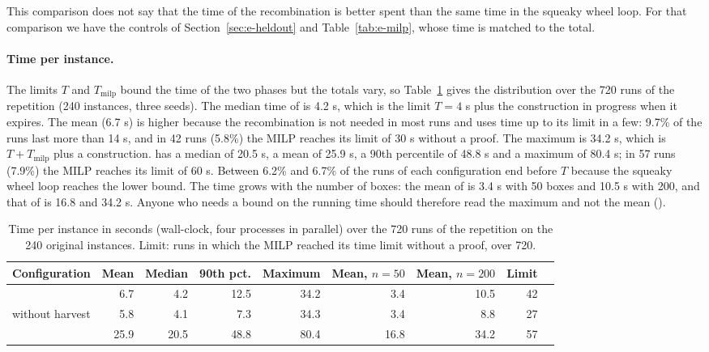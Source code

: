 This comparison does not say that the time of the recombination is better spent than the same time in the squeaky wheel loop. For that
comparison we have the controls of Section~\ref{sec:e-heldout} and Table~\ref{tab:e-milp}, whose time is matched to the total.

\paragraph{Time per instance.}
The limits $T$ and $T_{\mathrm{milp}}$ bound the time of the two phases but the totals vary, so Table~\ref{tab:e-time} gives the distribution over the 720 runs of the repetition (240 instances, three seeds).
The median time of \cfgfast{} is 4.2 s, which is the limit $T=4$ s plus the construction in progress when it expires. The mean (6.7 s) is higher because the recombination is not needed in most runs and uses time up to its limit in a few: 9.7\% of the runs last more than 14 s,
and in 42 runs (5.8\%) the MILP reaches its limit of 30 s without a proof. The maximum is 34.2 s, which is $T+T_{\mathrm{milp}}$ plus a construction. \cfgbal{} has a median of 20.5 s, a mean of 25.9 s, a 90th percentile of 48.8 s and a maximum of 80.4 s;
in 57 runs (7.9\%) the MILP reaches its limit of 60 s. Between 6.2\% and 6.7\% of the runs of each configuration end before $T$ because the squeaky wheel loop reaches the lower bound. The time grows with the number of boxes: the mean of \cfgfast{}
is 3.4 s with 50 boxes and 10.5 s with 200, and that of \cfgbal{} is 16.8 and 34.2 s. Anyone who needs a bound on the running time should therefore read the maximum and not the mean
().

\begin{table}[t]
\centering
\small\setlength{\tabcolsep}{4pt}
\caption{Time per instance in seconds (wall-clock, four processes in parallel) over the 720 runs of the repetition on the 240 original instances. Limit: runs in which the MILP reached its time limit without a proof, over 720.}
\label{tab:e-time}
\begin{tabular}{@{}lrrrrrrrr@{}}
\toprule
Configuration & Mean & Median & 90th pct. & Maximum & Mean, $n=50$ & Mean, $n=200$ & Limit\\
\midrule
\cfgfast{} & 6.7 & 4.2 & 12.5 & 34.2 & 3.4 & 10.5 & 42\\
\cfgfast{} without harvest & 5.8 & 4.1 & 7.3 & 34.3 & 3.4 & 8.8 & 27\\
\cfgbal{} & 25.9 & 20.5 & 48.8 & 80.4 & 16.8 & 34.2 & 57\\
\bottomrule
\end{tabular}
\end{table}

